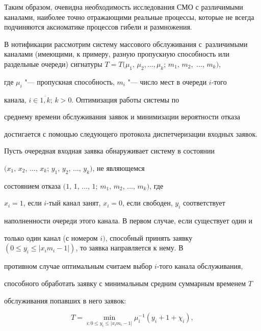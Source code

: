 Таким образом, очевидна необходимость исследования СМО с различимыми каналами, наиболее точно отражающими реальные процессы, которые не всегда подчиняются аксиоматике процессов гибели и размножения.



В нотификации \cite{kotenko:bib10,kotenko:bib11} рассмотрим систему массового обслуживания с~различимыми каналами (имеющими, к примеру, разную пропускную способность или раздельные очереди) сигнатуры $T=T(\mu_1,\,\mu_2,\ldots,\mu_k;\,m_1,\,m_2$,~$\ldots$, $m_k)$,

где $\mu_i$ "--- пропускная способность, $m_i$ "--- число мест в очереди $i$-того

канала, $i \in \overline{1, k}$; $k>$0. Оптимизация работы системы по

среднему времени обслуживания заявок и минимизации вероятности отказа

достигается с помощью следующего протокола диспетчеризации входных заявок.



Пусть очередная входная заявка обнаруживает систему в состоянии \linebreak

$(x_1,\,x_2$, $\ldots,\,x_k;\,y_1,\,y_2,\,\ldots,\,y_k)$, не являющемся

состоянием отказа $(1,\,1,\,\ldots,\,1$; $m_1,\,m_2$, $\ldots,\,m_k)$, где

$x_i=1$, если $i$-тый канал занят, $x_i=0$, если свободен, $y_{i}$ соответствует

наполненности очереди этого канала. В первом случае, если существует один и

только один канал (с номером $i)$, способный принять заявку $\left( {0\le y_i

\le \left| {x_i m_i -1} \right|} \right)$, то заявка направляется к нему. В

противном случае оптимальным считаем выбор $i$-того канала обслуживания,

способного обработать заявку с минимальным средним суммарным временем $T$

обслуживания попавших в него заявок:

\begin{equation}

\label{kotenko:eq1}

T=\min \limits_{i:0\le y_i \le |x_i m_i -1|} \mu_i^{-1} (y_i +1+\chi_i),

\end{equation}

